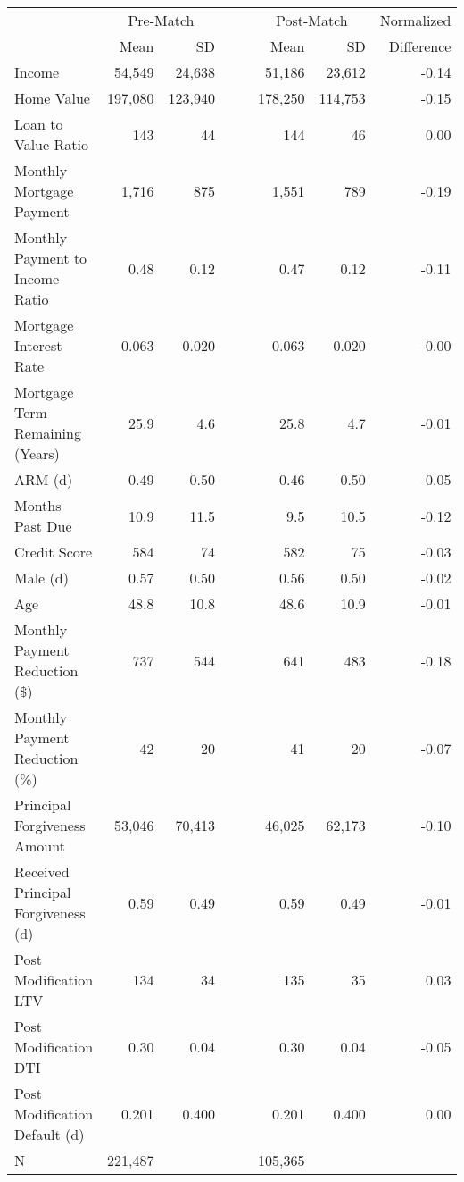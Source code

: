 \begin{tabular}{lrrllrrr}
  \toprule
 \midrule
  & \multicolumn{2}{c}{Pre-Match} & & &\multicolumn{2}{c}{Post-Match} & Normalized\\& Mean & SD &&& Mean & SD & Difference\\ \midrule
Income & 54,549 & 24,638 &  &  & 51,186 & 23,612 & -0.14 \\ 
  Home Value & 197,080 & 123,940 &  &  & 178,250 & 114,753 & -0.15 \\ 
  Loan to Value Ratio & 143 & 44 &  &  & 144 & 46 & 0.00 \\ 
  Monthly Mortgage Payment & 1,716 & 875 &  &  & 1,551 & 789 & -0.19 \\ 
  Monthly Payment to Income Ratio & 0.48 & 0.12 &  &  & 0.47 & 0.12 & -0.11 \\ 
  Mortgage Interest Rate & 0.063 & 0.020 &  &  & 0.063 & 0.020 & -0.00 \\ 
  Mortgage Term Remaining (Years) & 25.9 & 4.6 &  &  & 25.8 & 4.7 & -0.01 \\ 
  ARM (d) & 0.49 & 0.50 &  &  & 0.46 & 0.50 & -0.05 \\ 
  Months Past Due & 10.9 & 11.5 &  &  & 9.5 & 10.5 & -0.12 \\ 
  Credit Score & 584 & 74 &  &  & 582 & 75 & -0.03 \\ 
  Male (d) & 0.57 & 0.50 &  &  & 0.56 & 0.50 & -0.02 \\ 
  Age & 48.8 & 10.8 &  &  & 48.6 & 10.9 & -0.01 \\ 
  Monthly Payment Reduction (\$) & 737 & 544 &  &  & 641 & 483 & -0.18 \\ 
  Monthly Payment Reduction (\%) & 42 & 20 &  &  & 41 & 20 & -0.07 \\ 
  Principal Forgiveness Amount & 53,046 & 70,413 &  &  & 46,025 & 62,173 & -0.10 \\ 
  Received Principal Forgiveness (d) & 0.59 & 0.49 &  &  & 0.59 & 0.49 & -0.01 \\ 
  Post Modification LTV & 134 & 34 &  &  & 135 & 35 & 0.03 \\ 
  Post Modification DTI & 0.30 & 0.04 &  &  & 0.30 & 0.04 & -0.05 \\ 
  Post Modification Default (d) & 0.201 & 0.400 &  &  & 0.201 & 0.400 & 0.00 \\ 
   \midrule
N & 221,487 &  &  &  & 105,365 &  &  \\ 
   \midrule
 \bottomrule
\end{tabular}
